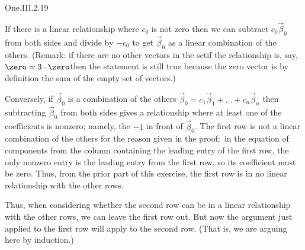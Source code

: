 \begin{ans}{One.III.2.19}
          \begin{exparts}
           \partsitem If there is a linear relationship where $c_0$ is not zero
             then we can subtract $c_0\vec{\beta}_0$ from both sides and divide
             by $-c_0$ to get $\vec{\beta}_0$ as a linear
             combination of the others.
             (Remark:
             if there are no other vectors in the set\Dash if the
             relationship is, say,
             $\zero=3\cdot\zero$\Dash then the statement is still true because
             the zero vector is by definition the sum of the empty set
             of vectors.)

             Conversely, if $\vec{\beta}_0$ is a combination of the others
             $\vec{\beta}_0=c_1\vec{\beta}_1+\dots+c_n\vec{\beta}_n$
             then subtracting
             $\vec{\beta}_0$ from both sides gives a relationship where
             at least one
             of the coefficients is nonzero; namely,
             the $-1$ in front of $\vec{\beta}_0$.
           \partsitem The first row is not a linear combination of the
             others for
             the reason given in the proof:~in the equation of components from
             the column containing the leading entry of the first row, the
             only nonzero entry is the leading entry from the first row, so
             its coefficient must be zero.
             Thus, from the prior part of this exercise, the first row is in
             no linear relationship with the other rows.

             Thus, when considering whether the second row can be in a linear
             relationship
             with the other rows, we can leave the first row out.
             But now the argument just applied to the first row will apply
             to the second row.
             (That is, we are arguing here by induction.)
         \end{exparts}
      
\end{ans}
